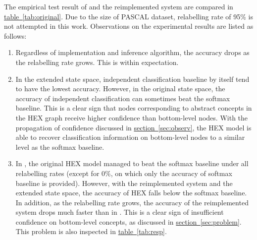\documentclass[11pt,a4paper]{article}
\begin{document}
The empirical test result of \cite{deng2014large} and the reimplemented system are compared in \hyperref[tab:original]{table~\ref{tab:original}}. Due to the size of PASCAL dataset, relabelling rate of 95\% is not attempted in this work. Observations on the experimental results are listed as follows:
\begin{enumerate}
\item Regardless of implementation and inference algorithm, the accuracy drops as the relabelling rate grows. This is within expectation.
\item In the extended state space, independent classification baseline by itself tend to have the lowest accuracy. However, in the original state space, the accuracy of independent classification can sometimes beat the softmax baseline. This is a clear sign that nodes corresponding to abstract concepts in the HEX graph receive higher confidence than bottom-level nodes. With the propagation of confidence discussed in \hyperref[sec:observ]{section~\ref{sec:observ}}, the HEX model is able to recover classification information on bottom-level nodes to a similar level as the softmax baseline.
\item In \cite{deng2014large}, the original HEX model managed to beat the softmax baseline under all relabelling rates (except for 0\%, on which only the accuracy of softmax baseline is provided). However, with the reimplemented system and the extended state space, the accuracy of HEX falls below the softmax baseline. In addition, as the relabelling rate grows, the accuracy of the reimplemented system drops much faster than in \cite{deng2014large}. This is a clear sign of insufficient confidence on bottom-level concepts, as discussed in \hyperref[sec:problem]{section~\ref{sec:problem}}. This problem is also inspected in \hyperref[tab:resp]{table~\ref{tab:resp}}.
\end{enumerate}
\end{document}
